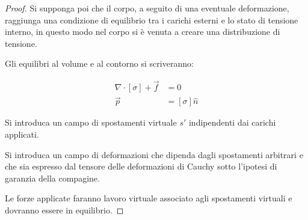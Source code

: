 \documentclass{article}
\begin{document}
\begin{adjustwidth}{2in}{}
	\begin{proof}
		Si supponga poi che il corpo, a seguito di una eventuale deformazione, raggiunga una condizione
	di equilibrio tra i carichi esterni e lo stato di tensione interno, in questo modo nel corpo si è venuta a creare una distribuzione di tensione. \newline 
	
	Gli equilibri al volume e al contorno si scriveranno: 

	\[
	\begin{aligned}
		\nabla \cdot [\sigma] + \vec{f} & = 0 \\
		\vec{p} & = [\sigma]\hat{n}
	\end{aligned}
	\]
	
	Si introduca un campo di spostamenti virtuale $ s' $ indipendenti dai carichi applicati.\newline
	
	Si introduca un campo di deformazioni che dipenda dagli spostamenti arbitrari e che sia espresso dal tensore delle deformazioni di Cauchy sotto l’ipotesi di
	garanzia della compagine. \newline
	
	Le forze applicate faranno lavoro virtuale associato agli spostamenti virtuali e dovranno essere in equilibrio.
	

\end{proof}
\end{adjustwidth}
\end{document}
